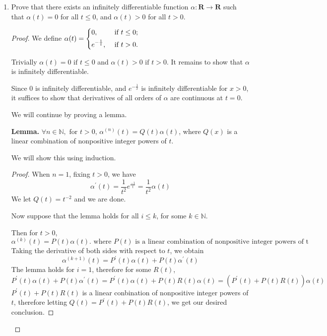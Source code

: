 \documentclass{article}
\newcommand{\R}{\mathbf{R}}
\theoremstyle{plain} %
\numberwithin{thm}{section} %
\theoremstyle{definition}
\begin{document}
    \begin{enumerate}[label=(\alph*)]
        \item Prove that there exists an infinitely differentiable function $\alpha:\R\rightarrow \R$ such that $\alpha(t)=0$ for all $t\leq 0$, and $\alpha(t)>0$ for all $t>0$.

        \begin{proof}
            We define \(\alpha (t) =
            \begin{dcases}
                0, &\text{ if } t \leq 0 ;\\
                e^{-\frac{1}{t}} , &\text{ if } t > 0.\\
            \end{dcases}\) 
            
            Trivially \(\alpha (t) = 0 \text{ if } t \leq 0\) and \(\alpha (t) > 0 \text{ if }t > 0\). It remains to show that \(\alpha \) is infinitely differentiable.

            Since \(0\) is infinitely differentiable, and \(e^{-\frac{1}{x}}\) is infinitely differentiable for \(x > 0\), it suffices to show that derivatives of all orders of \(\alpha \) are continuous at \(t = 0\).

            We will continue by proving a lemma.

            \textbf{Lemma.} \(\forall n \in \mathbb{N}, \text{ for } t > 0 \text{, } \alpha^{(n)} (t) = Q(t)\alpha (t)\), where \(Q(x)\) is a linear combination of nonpositive integer powers of \(t\).

            We will show this using induction.
            \begin{proof}
                When \(n=1\), fixing \(t > 0\), we have
                \[
                    \alpha ^\prime(t) = \frac{1}{t^2}e^\frac{-1}{t} = \frac{1}{t^2}\alpha (t)
                \]
                We let \(Q(t) = t^{-2}\) and we are done.

                Now suppose that the lemma holds for all \(i \leq k\), for some \(k \in \mathbb{N}\).

                Then for \(t > 0\),
                \[
                    \alpha ^{(k)}(t) = P(t)\alpha (t). \text{ where } P(t) \text{ is a linear combination of nonpositive integer powers of t}
                \]
                Taking the derivative of both sides with respect to \(t\), we obtain
                \[
                    \alpha ^{(k+1)}(t) = P^\prime(t)\alpha (t) + P(t)\alpha ^\prime (t)
                \]
                The lemma holds for \(i = 1\), therefore for some \(R(t)\),
                \[
                    P^\prime(t)\alpha (t) + P(t)\alpha ^\prime (t) = P^\prime(t)\alpha (t) + P(t)R(t)\alpha (t) = (P^\prime(t) + P(t)R(t))\alpha (t)
                \]
                \(P^\prime(t) + P(t)R(t)\) is a linear conbination of nonpositive integer powers of \(t\), therefore letting \(Q(t) = P^\prime(t) + P(t)R(t)\), we get our desired conclusion.


\end{proof}
\end{proof}
\end{enumerate}
\end{document}
